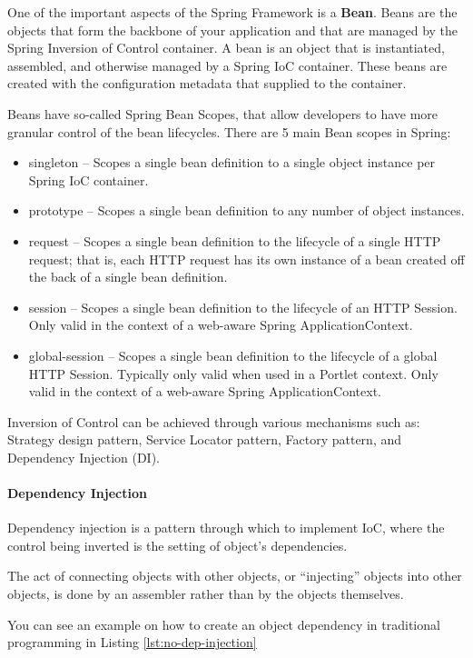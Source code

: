 \documentclass[thesis=M,english,hidelinks]{FITthesis}[2019/12/23]
\begin{document}
One of the important aspects of the Spring Framework is a \textbf{Bean}. Beans are the objects that form the backbone of your application and that are managed by the Spring Inversion of Control container. A bean is an object that is instantiated, assembled, and otherwise managed by a Spring IoC container. These beans are created with the configuration metadata that supplied to the container.

Beans have so-called Spring Bean Scopes, that allow developers to have more granular control of the bean lifecycles. There are 5 main Bean scopes in Spring:

\begin{itemize}
	\item singleton – Scopes a single bean definition to a single object instance per Spring IoC container.
	\item prototype –	Scopes a single bean definition to any number of object instances.
	\item request – Scopes a single bean definition to the lifecycle of a single HTTP request; that is, each HTTP request has its own instance of a bean created off the back of a single bean definition. 
	\item session – Scopes a single bean definition to the lifecycle of an HTTP Session. Only valid in the context of a web-aware Spring ApplicationContext.
	\item global-session – 	Scopes a single bean definition to the lifecycle of a global HTTP Session. Typically only valid when used in a Portlet context. Only valid in the context of a web-aware Spring ApplicationContext.
\end{itemize}

Inversion of Control can be achieved through various mechanisms such as: Strategy design pattern, Service Locator pattern, Factory pattern, and Dependency Injection (DI).

\paragraph{Dependency Injection}

Dependency injection is a pattern through which to implement IoC, where the control being inverted is the setting of object's dependencies.

The act of connecting objects with other objects, or “injecting” objects into other objects, is done by an assembler rather than by the objects themselves.

You can see an example on how to create an object dependency in traditional programming in Listing \ref{lst:no-dep-injection}
\end{document}
